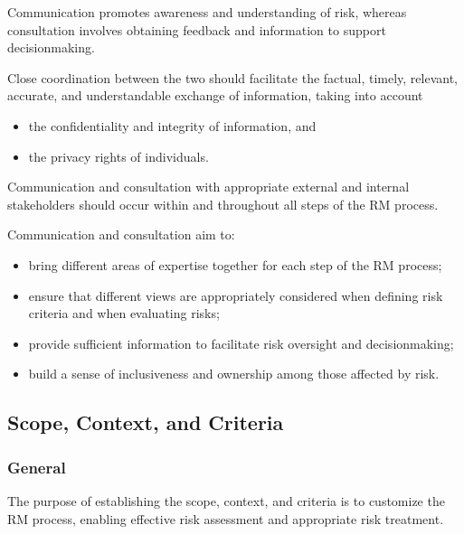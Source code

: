 \documentclass[letterpaper,10pt,english]{jupyterBook}
\begin{document}
\sphinxAtStartPar
Communication promotes awareness and understanding of risk, whereas consultation involves obtaining feedback and information to support decision\sphinxhyphen{}making.

\sphinxAtStartPar
Close coordination between the two should facilitate the factual, timely, relevant, accurate, and understandable exchange of information, taking into account
\begin{itemize}
\item {} 
\sphinxAtStartPar
the confidentiality and integrity of information, and

\item {} 
\sphinxAtStartPar
the privacy rights of individuals.

\end{itemize}

\sphinxAtStartPar
Communication and consultation with appropriate external and internal stakeholders should occur within and throughout all steps of the RM process.

\sphinxAtStartPar
Communication and consultation aim to:
\begin{itemize}
\item {} 
\sphinxAtStartPar
bring different areas of expertise together for each step of the RM process;

\item {} 
\sphinxAtStartPar
ensure that different views are appropriately considered when defining risk criteria and when evaluating risks;

\item {} 
\sphinxAtStartPar
provide sufficient information to facilitate risk oversight and decision\sphinxhyphen{}making;

\item {} 
\sphinxAtStartPar
build a sense of inclusiveness and ownership among those affected by risk.

\end{itemize}


\subsection{Scope, Context, and Criteria}
\label{\detokenize{PM/rm:scope-context-and-criteria}}

\subsubsection{General}
\label{\detokenize{PM/rm:id1}}
\sphinxAtStartPar
The purpose of establishing the scope, context, and criteria is to customize the RM process, enabling effective risk assessment and appropriate risk treatment.
\end{document}
